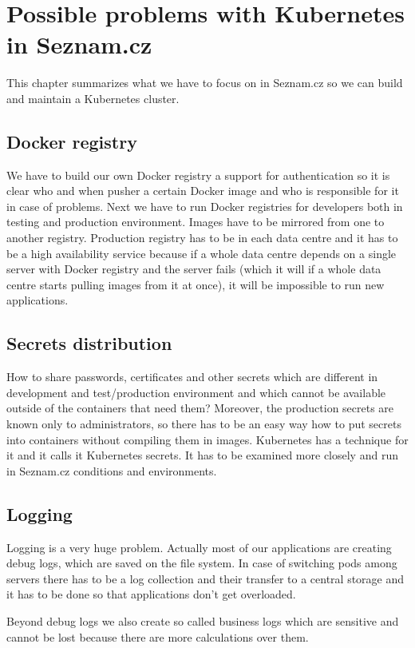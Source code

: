 \chapter{Possible problems with Kubernetes in Seznam.cz}

This chapter summarizes what we have to focus on in Seznam.cz so we can build and maintain a Kubernetes cluster.

\section{Docker registry}
We have to build our own Docker registry a support for authentication so it is clear who and when pusher a certain Docker image and who is responsible for it in case of problems. Next we have to run Docker registries for developers both in testing and production environment. Images have to be mirrored from one to another registry. Production registry has to be in each data centre and it has to be a high availability service because if a whole data centre depends on a single server with Docker registry and the server fails (which it will if a whole data centre starts pulling images from it at once), it will be impossible to run new applications.

\section{Secrets distribution}
How to share passwords, certificates and other secrets which are different in development and test/production environment and which cannot be available outside of the containers that need them? Moreover, the production secrets are known only to administrators, so there has to be an easy way how to put secrets into containers without compiling them in images. Kubernetes has a technique for it and it calls it Kubernetes secrets. It has to be examined more closely and run in Seznam.cz conditions and environments.

\section{Logging}
Logging is a very huge problem. Actually most of our applications are creating debug logs, which are saved on the file system. In case of switching pods among servers there has to be a log collection and their transfer to a central storage and it has to be done so that applications don’t get overloaded.

Beyond debug logs we also create so called business logs which are sensitive and cannot be lost because there are more calculations over them.

